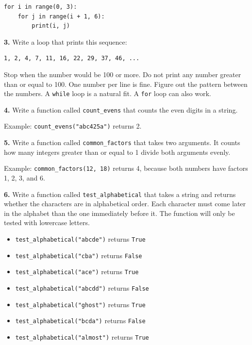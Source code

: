 \documentclass[11pt]{article}
\begin{document}
\begin{lstlisting}
for i in range(0, 3):
    for j in range(i + 1, 6):
        print(i, j)
\end{lstlisting}

\textbf{3.} Write a loop that prints this sequence:

\begin{lstlisting}
1, 2, 4, 7, 11, 16, 22, 29, 37, 46, ...
\end{lstlisting}

Stop when the number would be 100 or more. Do not print any number greater than or equal to 100. One number per line is fine. Figure out the pattern between the numbers. A \texttt{while} loop is a natural fit. A \texttt{for} loop can also work.

\textbf{4.} Write a function called \texttt{count\_evens} that counts the even digits in a string.

Example: \texttt{count\_evens("abc425a")} returns 2.

\textbf{5.} Write a function called \texttt{common\_factors} that takes two arguments. It counts how many integers greater than or equal to 1 divide both arguments evenly.

Example: \texttt{common\_factors(12, 18)} returns 4, because both numbers have factors 1, 2, 3, and 6.

\textbf{6.} Write a function called \texttt{test\_alphabetical} that takes a string and returns whether the characters are in alphabetical order. Each character must come later in the alphabet than the one immediately before it. The function will only be tested with lowercase letters.

\begin{itemize}
    \item \texttt{test\_alphabetical("abcde")} returns \texttt{True}
    \item \texttt{test\_alphabetical("cba")} returns \texttt{False}
    \item \texttt{test\_alphabetical("ace")} returns \texttt{True}
    \item \texttt{test\_alphabetical("abcdd")} returns \texttt{False}
    \item \texttt{test\_alphabetical("ghost")} returns \texttt{True}
    \item \texttt{test\_alphabetical("bcda")} returns \texttt{False}
    \item \texttt{test\_alphabetical("almost")} returns \texttt{True}
\end{itemize}
\end{document}
